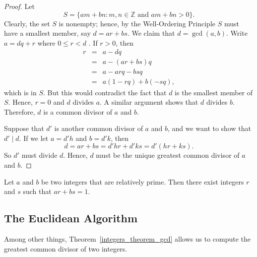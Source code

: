 \begin{proof}
Let
\[
S = \{ am + bn : m, n \in {\mathbb Z} \mbox{ and } am + bn	> 0 \}.
\]
Clearly, the set $S$ is nonempty; hence, by the Well-Ordering Principle $S$ must have a smallest member, say $d = ar + bs$.  We claim that $d = \gcd( a, b)$.  Write $a = dq + r$ where $0 \leq r < d$ . If $r > 0$, then 
\begin{eqnarray*}
r 
& = & a - dq \\
& = & a - (ar + bs)q \\
& = & a - arq - bsq \\
& = & a( 1 - rq ) + b( -sq ),
\end{eqnarray*}
which is in $S$.  But this would contradict the fact that $d$ is the smallest member of $S$.  Hence, $r = 0$ and $d$ divides $a$.  A similar argument shows that $d$ divides $b$.  Therefore, $d$ is a common divisor of $a$ and $b$.

Suppose that $d'$ is another common divisor of $a$ and $b$, and we want to show that $d' \mid d$. If we let $a = d'h$ and $b = d'k$, then
\[
d = ar + bs = d'hr + d'ks = d'(hr + ks).
\]
So $d'$ must divide $d$. Hence, $d$ must be the unique greatest common divisor of $a$ and $b$. 
\end{proof}

\begin{corollary}\label{integers_theorem_coprime}
Let $a$ and $b$ be two integers that are relatively prime. Then there exist  integers $r$ and $s$ such that $ar + bs = 1$. 
\end{corollary}
 
 
\subsection*{The Euclidean Algorithm}

Among other things, Theorem~\ref{integers_theorem_gcd} allows us to compute the greatest common divisor of two integers. 

\medskip

